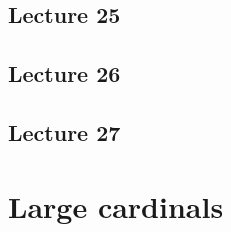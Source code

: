 \documentclass[10pt,letterpaper,cm]{nupset}
\theoremstyle{definition}
\theoremstyle{theorem}
\theoremstyle{remark}
\newcommand{\N}{\mathbb N}
\newcommand{\1}{\mathbf{1}}
\newcommand{\0}{\vec 0}
\newcommand{\zfc}{\mathsf{ZFC}}
\newcommand{\ac}{\mathsf{AC}}
\newcommand{\ord}{\mathsf{OR}}
\DeclareMathOperator{\cf}{cf}
\begin{document}

\subsection{Lecture 25}

\subsection{Lecture 26}

\subsection{Lecture 27}


\section{Large cardinals}
\end{document}

